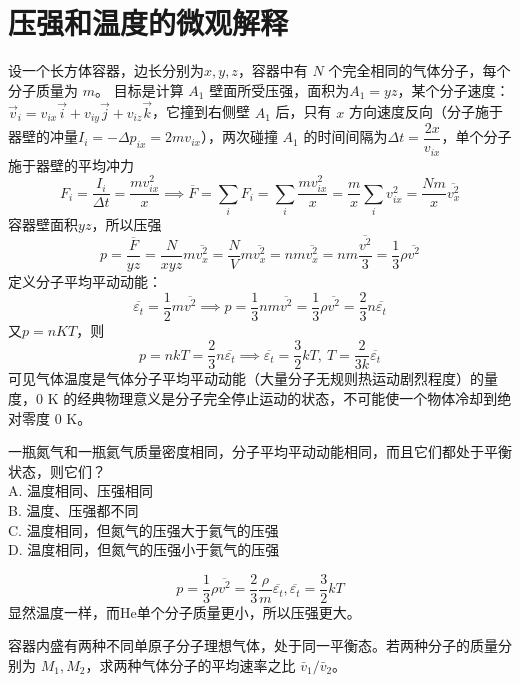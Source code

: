 \documentclass[lang=cn,11pt]{elegantbook}
\begin{document}
\section{压强和温度的微观解释}

\begin{definition}[气体压强的微观来源]
设一个长方体容器，边长分别为$x,y,z$，容器中有 \(N\) 个完全相同的气体分子，每个分子质量为 \(m\)。
目标是计算 \(A_1\) 壁面所受压强，面积为$A_1=yz$，某个分子速度：$\vec v_i=v_{ix}\vec i+v_{iy}\vec j+v_{iz}\vec k$，它撞到右侧壁 \(A_1\) 后，只有 \(x\) 方向速度反向（分子施于器壁的冲量$I_i=-\Delta p_{ix}=2mv_{ix}$），两次碰撞 \(A_1\) 的时间间隔为$\Delta t=\dfrac{2x}{v_{ix}}$，单个分子施于器壁的平均冲力\[F_i=\frac{I_i}{\Delta t}=\frac{mv_{ix}^2}{x}\implies\overline F=\sum_iF_i=\sum_i\frac{mv_{ix}^2}{x}=\frac{m}{x}\sum_i v_{ix}^2=\frac{Nm}{x}\overline{v_x^2}\]容器壁面积$yz$，所以压强\[p=\frac{\overline F}{yz}=\frac{N}{xyz}m\overline{v_x^2}=\frac{N}{V}m\overline{v_x^2}=nm\overline{v_x^2}=nm\frac{\overline{v^2}}{3}=\frac13\rho \overline{v^2}\]定义分子平均平动动能：\[\overline{\varepsilon_t}=\frac12m\overline{v^2}\implies \boxed{p=\frac{1}{3}nm\overline{v^2}=\frac13\rho\overline{v^2}=\frac23n\overline{\varepsilon_t}}\]
又$p=nKT$，则\[p=nkT=\frac23n\overline{\varepsilon_t}\implies\overline{\varepsilon_t}=\frac32kT,~T=\frac{2}{3k}\overline{\varepsilon_t}\]可见气体温度是气体分子平均平动动能（大量分子无规则热运动剧烈程度）的量度，\(0\text{ K}\) 的经典物理意义是分子完全停止运动的状态，不可能使一个物体冷却到绝对零度 \(0\text{ K}\)。
\end{definition}

\begin{exercise}
一瓶氮气和一瓶氦气质量密度相同，分子平均平动动能相同，而且它们都处于平衡状态，则它们？\\
A. 温度相同、压强相同\\
B. 温度、压强都不同\\
C. 温度相同，但氮气的压强大于氦气的压强\\
D. 温度相同，但氮气的压强小于氦气的压强
\end{exercise}
\begin{solution}
\[p=\frac13\rho\overline{v^2}=\frac23\frac{\rho}{m}\overline{\varepsilon_t},\overline{\varepsilon_t}=\frac32kT\]显然温度一样，而He单个分子质量更小，所以压强更大。
\end{solution}

\begin{exercise}
容器内盛有两种不同单原子分子理想气体，处于同一平衡态。若两种分子的质量分别为 \(M_1,M_2\)，求两种气体分子的平均速率之比 \(\bar v_1/\bar v_2\)。
\end{exercise}
\end{document}
